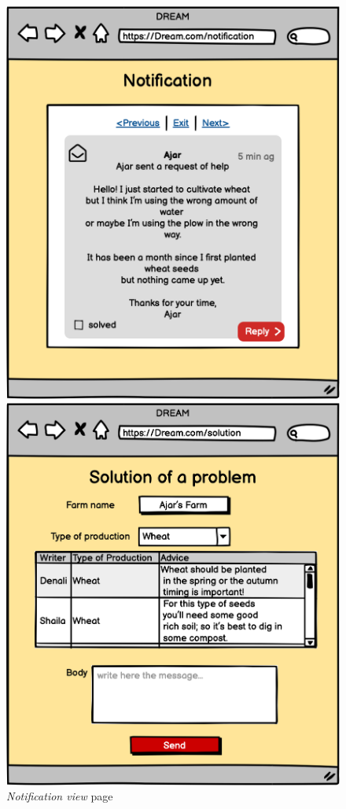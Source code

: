 \begin{figure}[H]
    \begin{minipage}{0.4\textwidth}
        \centering
        \includegraphics[width=1\textwidth]{images/mockups/PMNotification.png}
        \caption{\emph{Notification view} page}
        \label{fig:pmnot}
    \end{minipage}\hfill
    \begin{minipage}{0.39\textwidth}
        \centering
        \includegraphics[width=1\textwidth]{images/mockups/Solution.png}

\end{minipage}
\end{figure}

